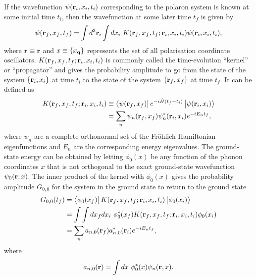 If the wavefunction $\psi(\vb{r}_{i}, x_i, t_i)$ corresponding to the polaron system is known at some initial time $t_{i}$, then the wavefunction at some later time $t_f$ is given by
\begin{equation}
    \psi(\vb{r}_{f}, x_{f}, t_f) = \int d^3\vb{r}_{i} \int dx_i\ K(\vb{r}_{f}, x_f, t_f; \vb{r}_{i}, x_i, t_i) \psi(\vb{r}_{i}, x_i, t_i),
\label{eqn-221-1}
\end{equation}
where $\vb{r} \equiv \vb{r}$ and $x \equiv \{x_{\vb{q}}\}$ represents the set of all polarisation coordinate oscillators. $K(\vb{r}_{f}, x_f, t_f; \vb{r}_{i}, x_i, t_i)$ is commonly called the time-evolution ``kernel'' or ``propagator'' and gives the probability amplitude to go from the state of the system $\{\vb{r}_{i}, x_i\}$ at time $t_i$ to the state of the system $\{\vb{r}_{f}, x_f\}$ at time $t_f$. It can be defined as
\begin{equation}
\begin{aligned}
    K(\vb{r}_{f}, x_f, t_f; \vb{r}_{i}, x_i, t_i) &\equiv \bra{\psi(\vb{r}_f, x_f)} e^{-i\hat{H}(t_f - t_i)} \ket{\psi(\vb{r}_i, x_i)} \\
    &= \sum_n \psi_n(\vb{r}_f, x_f) \psi_n^*(\vb{r}_i, x_i) e^{-i E_n t_f},
\end{aligned}
\label{eqn-221-2}
\end{equation}
where $\psi_n$ are a complete orthonormal set of the Fr\"ohlich Hamiltonian eigenfunctions and $E_n$ are the corresponding energy eigenvalues. The ground-state energy can be obtained by letting $\phi_0(x)$ be any function of the phonon coordinates $x$ that is not orthogonal to the exact ground-state wavefunction $\psi_0(\vb{r}, x)$. The inner product of the kernel with $\phi_0(x)$ gives the probability amplitude $G_{0,0}$ for the system in the ground state to return to the ground state 
\begin{equation}
\begin{aligned}
    G_{0,0}(t_f) &= \bra{\phi_0(x_f)} K(\vb{r}_{f}, x_f, t_f; \vb{r}_{i}, x_i, t_i) \ket{\phi_0(x_i)} \\
    &= \int\int dx_f dx_i\ \phi_0^*(x_f) K(\vb{r}_{f}, x_f, t_f; \vb{r}_{i}, x_i, t_i) \phi_0(x_i) \\
    &= \sum_n a_{n,0}(\vb{r}_f) a^*_{n,0}(\vb{r}_i) e^{-i E_n t_f},
\end{aligned}
\label{eqn-221-3}
\end{equation}
where
\begin{equation}
    a_{n,0}(\vb{r}) = \int dx\ \phi^*_0(x) 
    \psi_n(\vb{r}, x).
\label{eqn-221-4}
\end{equation}
